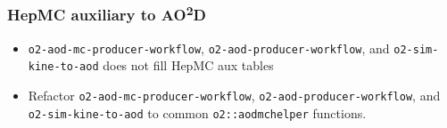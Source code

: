 \documentclass[compress,table,8pt]{beamer}
\newcommand\AOD{AO\textsuperscript{2}D}
\begin{document}
\begin{frame}
  \frametitle{HepMC auxiliary to \AOD{}}

  \begin{itemize}[<+->]
  \item \texttt{o2-aod-mc-producer-workflow},
    \texttt{o2-aod-producer-workflow}, and \texttt{o2-sim-kine-to-aod}
    does not fill HepMC aux tables
  \end{itemize}


  \begin{itemize}[<+->]
  \item Refactor \texttt{o2-aod-mc-producer-workflow},
    \texttt{o2-aod-producer-workflow}, and \texttt{o2-sim-kine-to-aod}
    to common \texttt{o2::aodmchelper} functions.
  \end{itemize}

\end{frame}
\end{document}

